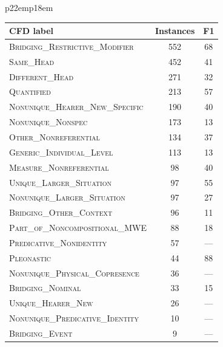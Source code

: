 \documentclass[portrait,final]{baposter}
\begin{document}
\begin{poster}
{\begin{left}
\begin{tabular}{p{22em}p{18em}}
\smaller [.7]
\begin{tabular}{|l|c|c|}
 \multicolumn{1}{p{9em}}{\bf \normalsize{CFD label}} & \multicolumn{1}{c}{\bf \normalsize{Instances}} & \multicolumn{1}{c}{\bf \normalsize{F1}} \\               
       \hline %
\textsc{Bridging\_Restrictive\_Modifier} & 552 & 68 \\
\textsc{Same\_Head} & 452 & 41 \\
\textsc{Different\_Head} & 271 & 32 \\
\textsc{Quantified} & 213 & 57 \\
\textsc{Nonunique\_Hearer\_New\_Specific} & 190 & 40 \\
\textsc{Nonunique\_Nonspec} & 173 & 13 \\
\textsc{Other\_Nonreferential} & 134 & 37 \\
\textsc{Generic\_Individual\_Level} & 113 & 13 \\
\textsc{Measure\_Nonreferential} & 98 & 40 \\
\textsc{Unique\_Larger\_Situation} & 97 & 55 \\
\textsc{Nonunique\_Larger\_Situation} & 97 & 27 \\
\textsc{Bridging\_Other\_Context} & 96 & 11 \\
\textsc{Part\_of\_Noncompositional\_MWE} & 88 & 18 \\
\textsc{Predicative\_Nonidentity} & 57 & --- \\
\textsc{Pleonastic} & 44 & 88 \\
\textsc{Nonunique\_Physical\_Copresence} & 36 & --- \\
\textsc{Bridging\_Nominal} & 33 & 15 \\
\textsc{Unique\_Hearer\_New} & 26 & --- \\
\textsc{Nonunique\_Predicative\_Identity} & 10 & --- \\
\textsc{Bridging\_Event} & 9 & --- \\
                        \hline%
\end{tabular} 
\end{tabular}
\end{left}
}
\end{poster}
\end{document}
